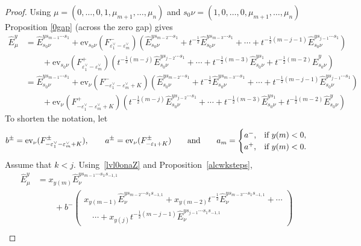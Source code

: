 \documentclass[11pt]{article}
\theoremstyle{plain}
\theoremstyle{definition}
\theoremstyle{remark}
\numberwithin{equation}{section}
\def\ev{\mathrm{ev}}
\newcounter{r}
\newcounter{s}
\begin{document}
\begin{proof} 
Using $\mu= (0, \ldots, 0, 1, \mu_{m+1}, \ldots, \mu_n)$ and $s_0\nu = (1, 0, \ldots, 0, \mu_{m+1}, \ldots, \mu_n)$
Proposition \ref{0gap} (across the zero gap) gives
\begin{align*}
\widehat{E}^y_\mu 
&= \widehat{E}^{ys_{m-1}\cdots s_1}_{s_0\nu} + 
\ev_{s_0\nu}(F^-_{\varepsilon^\vee_1-\varepsilon^\vee_m}) 
(
\widehat{E}^{ys_{m-2}\cdots s_1}_{s_0\nu}
+t^{-\frac12}\widehat{E}^{ys_{m-3}\cdots s_1}_{s_0\nu}
+\cdots + t^{-\frac12(m-j-1)} \widehat{E}^{ys_{j-1}\cdots s_1}_{s_0\nu}) 
\\
&\qquad
+\ev_{s_0\nu}(F^+_{\varepsilon^\vee_1-\varepsilon^\vee_m}) 
(t^{-\frac{1}{2}(m-j)} \widehat{E}^{ys_{j-2}\cdots s_1}_{s_0\nu}+\cdots 
+ t^{-\frac12(m-3)} \widehat{E}^{ys_1}_{s_0\nu}
+ t^{-\frac12(m-2)} \widehat{E}^y_{s_0\nu}) \\
&= \widehat{E}^{ys_{m-1}\cdots s_1}_{s_0\nu} + 
\ev_{\nu}(F^-_{-\varepsilon^\vee_1-\varepsilon^\vee_m + K}) 
(
\widehat{E}^{ys_{m-2}\cdots s_1}_{s_0\nu}
+t^{-\frac12}\widehat{E}^{ys_{m-3}\cdots s_1}_{s_0\nu}
+\cdots + t^{-\frac12(m-j-1)} \widehat{E}^{ys_{j-1}\cdots s_1}_{s_0\nu}) 
\\
&\qquad
+\ev_{\nu}(F^+_{-\varepsilon^\vee_1-\varepsilon^\vee_m + K}) 
(t^{-\frac{1}{2}(m-j)} \widehat{E}^{ys_{j-2}\cdots s_1}_{s_0\nu}+\cdots 
+ t^{-\frac12(m-3)} \widehat{E}^{ys_1}_{s_0\nu}
+ t^{-\frac12(m-2)} \widehat{E}^y_{s_0\nu})
\end{align*}
To shorten the notation, let
$$b^\pm = \ev_{\nu}(F^\pm_{-\varepsilon^\vee_1-\varepsilon^\vee_m+K}), \qquad
a^\pm = \ev_\nu(F^\pm_{-\varepsilon_1+K})
\qquad\hbox{and}\qquad
a_m = \begin{cases}
a^-, &\hbox{if $y(m)<0$,} \\
a^+, &\hbox{if $y(m)<0$.}
\end{cases}
$$
Assume that $k<j$.  Using~\eqref{lvl0onaZ} and Proposition~\ref{alcwksteps}, 
\begin{align*}
\widehat{E}^y_\mu 
&= x_{y(m)}\widehat{E}^{ys_{m-1}\cdots s_1s_{-1,1}}_{\nu} 
\\
&\qquad
+ b^- \left( \begin{array}{l}
x_{y(m-1)}\widehat{E}^{ys_{m-2}\cdots s_1s_{-1,1}}_{\nu}
+x_{y(m-2)}t^{-\frac12}\widehat{E}^{ys_{m-3}\cdots s_1s_{-1,1}}_{\nu}
+\cdots 
\\
\quad\cdots + x_{y(j)}t^{-\frac{1}{2}(m-j-1)} \widehat{E}^{ys_{j-1}\cdots s_1s_{-1,1}}_{\nu} 
\end{array}\right)
\\
&\qquad

\end{align*}
\end{proof}
\end{document}

